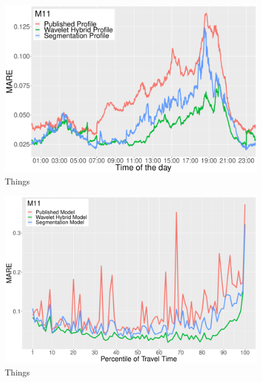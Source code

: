 \documentclass[letterpaper, 10 pt, conference]{ieeeconf}  %
\begin{document}
\begin{figure}[htbp]
	\centerline{\includegraphics[width=\linewidth]{./images/M11_daytime_8_12.pdf}}
	\caption{Things}
	\label{fig:m11dt}
\end{figure}

\begin{figure}[htbp]
	\centerline{\includegraphics[width=\linewidth]{./images/M11_quantile_1_rms_8_12.pdf}}
	\caption{Things}
	\label{fig:m11q}
\end{figure}
\end{document}
